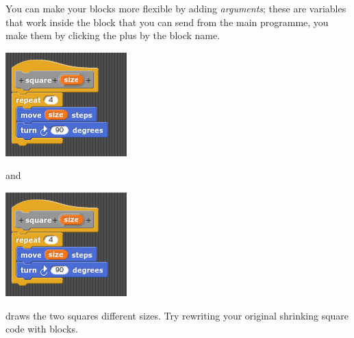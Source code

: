 \documentclass[11pt,a4paper]{scrartcl}
\begin{document}
You can make your blocks more flexible by adding \textsl{arguments};
these are variables that work inside the block that you can send from
the main programme, you make them by clicking the plus by the block
name.
\begin{center}
\includegraphics{two_squares_block_size_block.png}
\end{center}
and
\begin{center}
\includegraphics{two_squares_block_size_block.png}
\end{center}
draws the two squares different sizes. Try rewriting your original shrinking square code with blocks.
\end{document}
